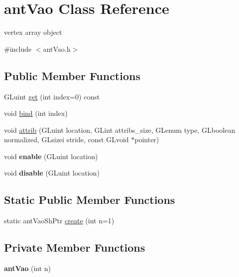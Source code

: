 \hypertarget{classant_vao}{\section{ant\+Vao Class Reference}
\label{classant_vao}
}


vertex array object  




{\ttfamily \#include $<$ant\+Vao.\+h$>$}

\subsection*{Public Member Functions}
\begin{DoxyCompactItemize}
\item 
G\+Luint \hyperlink{classant_vao_a5efa0defead323c3c9b1190dc5189aa5}{get} (int index=0) const 
\item 
void \hyperlink{classant_vao_a92bfa6b08372260e2e14dd9ab184f02f}{bind} (int index)
\item 
void \hyperlink{classant_vao_a9cf8c3b9de6c6e0f279c4e8933f9b74e}{attrib} (G\+Luint location, G\+Lint attribs\+\_\+size, G\+Lenum type, G\+Lboolean normalized, G\+Lsizei stride, const G\+Lvoid $\ast$pointer)
\item 
\hypertarget{classant_vao_ac8b6f2233f83ba83271f006f3b0be189}{void {\bfseries enable} (G\+Luint location)}\label{classant_vao_ac8b6f2233f83ba83271f006f3b0be189}

\item 
\hypertarget{classant_vao_a7b0fea83df63c01718d7f8cbe1cdf261}{void {\bfseries disable} (G\+Luint location)}\label{classant_vao_a7b0fea83df63c01718d7f8cbe1cdf261}

\end{DoxyCompactItemize}
\subsection*{Static Public Member Functions}
\begin{DoxyCompactItemize}
\item 
static ant\+Vao\+Sh\+Ptr \hyperlink{classant_vao_a7a2663eecd76da3414e347541a0dd7c7}{create} (int n=1)
\end{DoxyCompactItemize}
\subsection*{Private Member Functions}
\begin{DoxyCompactItemize}
\item 
\hypertarget{classant_vao_aaf3959d8db304d527398936346f81567}{{\bfseries ant\+Vao} (int n)}\label{classant_vao_aaf3959d8db304d527398936346f81567}

\end{DoxyCompactItemize}
